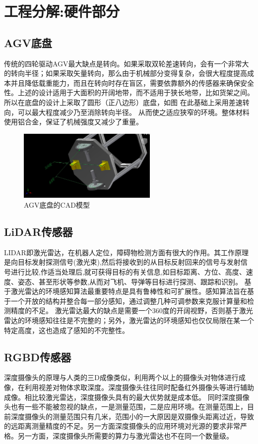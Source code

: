 \documentclass[cs4size,a4paper]{ctexart}
\numberwithin{equation}{section}
\numberwithin{table}{section}
\numberwithin{figure}{section}
\begin{document}
\section{工程分解:硬件部分}

\subsection{AGV底盘}
传统的四轮驱动AGV最大缺点是转向。如果采取双轮差速转向，会有一个非常大的转向半径；如果采取矢量转向，那么由于机械部分变得复杂，会很大程度提高成本并且降低载重能力，而且在转向时存在盲区，需要依靠额外的传感器来确保安全性。上述的设计适用于大面积的开阔地带，而不适用于狭长地带，比如货架之间。所以在底盘的设计上采取了圆形（正八边形）底盘，如图 在此基础上采用差速转向，可以最大程度减少乃至消除转向半径。
从而使之适应狭窄的环境。整体材料使用铝合金，保证了机械强度又减少了重量。
\begin{figure}[H]
        \centering
        \includegraphics[width=0.6\textwidth]{figure/wheel.png}
        \caption{AGV底盘的CAD模型}
\end{figure}

\subsection{LiDAR传感器}
LIDAR即激光雷达，在机器人定位，障碍物检测方面有很大的作用。其工作原理是向目标发射探测信号(激光束),然后将接收到的从目标反射回来的信号与发射信号进行比较,作适当处理后,就可获得目标的有关信息,如目标距离、方位、高度、速度、姿态、甚至形状等参数,从而对飞机、导弹等目标进行探测、跟踪和识别。
基于激光雷达的环境感知算法最重要特点是具有鲁棒性和可扩展性。感知算法旨在基于一个开放的结构并整合每一部分感知，通过调整几种可调参数来克服计算量和检测精度的不足。
激光雷达最大的缺点是需要一个360度的开阔视野，否则基于激光雷达的环境感知往往是不完整的；另外，激光雷达的环境感知也仅仅局限在某一个特定高度，这也造成了感知的不完整性。

\subsection{RGBD传感器}
深度摄像头的原理与人类的三D成像类似，利用两个以上的摄像头对物体进行成像，在利用视差对物体求取深度。深度摄像头往往同时配备红外摄像头等进行辅助成像。相比较激光雷达，深度摄像头具有的最大优势就是成本低。
同时深度摄像头也有一些不能被忽视的缺点，一是测量范围，二是应用环境。在测量范围上，目前深度摄像头的测量范围只有几米，范围小的一大原因是双摄像头距离过近，导致的远距离测量精度的不足。另一方面深度摄像头的应用环境对光源的要求非常严格。另一方面，深度摄像头所需要的算力与激光雷达也不在同一个数量级。
\end{document}
